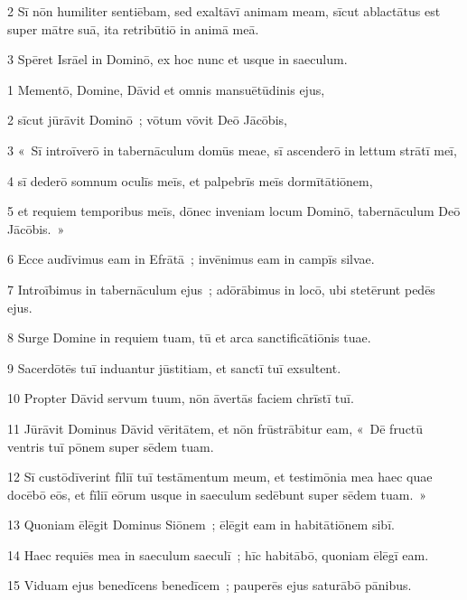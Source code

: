 \psalmVerse
  {\phantom{00}2}
  {Sī nōn humiliter sentiēbam, sed exaltāvī animam meam, sīcut ablactātus est super mātre suā, ita retribūtiō in animā meā.}


\psalmVerse
  {\phantom{00}3}
  {Spēret Isrāel in Dominō, ex hoc nunc et usque in saeculum.}



\psalmVerse
  {\phantom{00}1}
  {Mementō, Domine, Dāvid et omnis mansuētūdinis ejus,}


\psalmVerse
  {\phantom{00}2}
  {sīcut jūrāvit Dominō~; vōtum vōvit Deō Jācōbis,}


\psalmVerse
  {\phantom{00}3}
  {«~Sī introīverō in tabernāculum domūs meae, sī ascenderō in lettum strātī meī,}


\psalmVerse
  {\phantom{00}4}
  {sī dederō somnum oculīs meīs, et palpebrīs meīs dormītātiōnem,}


\psalmVerse
  {\phantom{00}5}
  {et requiem temporibus meīs, dōnec inveniam locum Dominō, tabernāculum Deō Jācōbis.~»}


\psalmVerse
  {\phantom{00}6}
  {Ecce audīvimus eam in Efrātā~; invēnimus eam in campīs silvae.}


\psalmVerse
  {\phantom{00}7}
  {Introībimus in tabernāculum ejus~; adōrābimus in locō, ubi stetērunt pedēs ejus.}


\psalmVerse
  {\phantom{00}8}
  {Surge Domine in requiem tuam, tū et arca sanctificātiōnis tuae.}


\psalmVerse
  {\phantom{00}9}
  {Sacerdōtēs tuī induantur jūstitiam, et sanctī tuī exsultent.}


\psalmVerse
  {\phantom{0}10}
  {Propter Dāvid servum tuum, nōn āvertās faciem chrīstī tuī.}


\psalmVerse
  {\phantom{0}11}
  {Jūrāvit Dominus Dāvid vēritātem, et nōn frūstrābitur eam, «~Dē fructū ventris tuī pōnem super sēdem tuam.}


\psalmVerse
  {\phantom{0}12}
  {Sī custōdīverint fīliī tuī testāmentum meum, et testimōnia mea haec quae docēbō eōs, et fīliī eōrum usque in saeculum sedēbunt super sēdem tuam.~»}


\psalmVerse
  {\phantom{0}13}
  {Quoniam ēlēgit Dominus Siōnem~; ēlēgit eam in habitātiōnem sibī.}


\psalmVerse
  {\phantom{0}14}
  {Haec requiēs mea in saeculum saeculī~; hīc habitābō, quoniam ēlēgī eam.}


\psalmVerse
  {\phantom{0}15}
  {Viduam ejus benedīcens benedīcem~; pauperēs ejus saturābō pānibus.}



